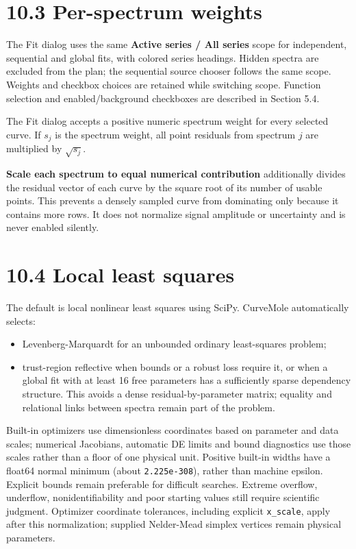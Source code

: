 \documentclass[
  10pt,
  a4paper,
  oneside]{scrreprt}
\providecommand{\tightlist}{%
  \setlength{\itemsep}{0pt}\setlength{\parskip}{0pt}}
\begin{document}
\hypertarget{per-spectrum-weights}{%
\section{10.3 Per-spectrum weights}\label{per-spectrum-weights}}

The Fit dialog uses the same \textbf{Active series / All series} scope
for independent, sequential and global fits, with colored series
headings. Hidden spectra are excluded from the plan; the sequential
source chooser follows the same scope. Weights and checkbox choices are
retained while switching scope. Function selection and
enabled/background checkboxes are described in Section 5.4.

The Fit dialog accepts a positive numeric spectrum weight for every
selected curve. If \(s_j\) is the spectrum weight, all point residuals
from spectrum \(j\) are multiplied by \(\sqrt{s_j}\).

\textbf{Scale each spectrum to equal numerical contribution}
additionally divides the residual vector of each curve by the square
root of its number of usable points. This prevents a densely sampled
curve from dominating only because it contains more rows. It does not
normalize signal amplitude or uncertainty and is never enabled silently.

\hypertarget{local-least-squares}{%
\section{10.4 Local least squares}\label{local-least-squares}}

The default is local nonlinear least squares using SciPy. CurveMole
automatically selects:

\begin{itemize}
\tightlist
\item
  Levenberg-Marquardt for an unbounded ordinary least-squares problem;
\item
  trust-region reflective when bounds or a robust loss require it, or
  when a global fit with at least 16 free parameters has a sufficiently
  sparse dependency structure. This avoids a dense residual-by-parameter
  matrix; equality and relational links between spectra remain part of
  the problem.
\end{itemize}

Built-in optimizers use dimensionless coordinates based on parameter and
data scales; numerical Jacobians, automatic DE limits and bound
diagnostics use those scales rather than a floor of one physical unit.
Positive built-in widths have a float64 normal minimum (about
\texttt{2.225e-308}), rather than machine epsilon. Explicit bounds
remain preferable for difficult searches. Extreme overflow, underflow,
nonidentifiability and poor starting values still require scientific
judgment. Optimizer coordinate tolerances, including explicit
\texttt{x\_scale}, apply after this normalization; supplied Nelder-Mead
simplex vertices remain physical parameters.
\end{document}
